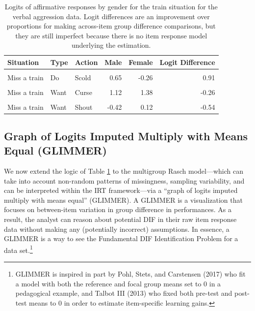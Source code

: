 \documentclass[
  english,
  man,floatsintext]{apa6}
\begin{document}
\begin{table}[H]

\caption{\label{tab:logits}Logits of affirmative responses by gender for the train situation for the verbal aggression data. Logit differences are an improvement over proportions for making across-item group difference comparisons, but they are still imperfect because there is no item response model underlying the estimation. }
\centering
\fontsize{10}{12}\selectfont
\begin{tabular}[t]{lllrrr}
\toprule
Situation & Type & Action & Male & Female & Logit Difference\\
\midrule
\cellcolor{gray!6}{Miss a train} & \cellcolor{gray!6}{Do} & \cellcolor{gray!6}{Curse} & \cellcolor{gray!6}{1.44} & \cellcolor{gray!6}{0.44} & \cellcolor{gray!6}{1.00}\\
Miss a train & Do & Scold & 0.65 & -0.26 & 0.91\\
\cellcolor{gray!6}{Miss a train} & \cellcolor{gray!6}{Do} & \cellcolor{gray!6}{Shout} & \cellcolor{gray!6}{-0.91} & \cellcolor{gray!6}{-1.18} & \cellcolor{gray!6}{0.28}\\
Miss a train & Want & Curse & 1.12 & 1.38 & -0.26\\
\cellcolor{gray!6}{Miss a train} & \cellcolor{gray!6}{Want} & \cellcolor{gray!6}{Scold} & \cellcolor{gray!6}{0.42} & \cellcolor{gray!6}{0.55} & \cellcolor{gray!6}{-0.13}\\
\addlinespace
Miss a train & Want & Shout & -0.42 & 0.12 & -0.54\\
\bottomrule
\end{tabular}
\end{table}

\hypertarget{graph-of-logits-imputed-multiply-with-means-equal-glimmer}{%
\subsection{Graph of Logits Imputed Multiply with Means Equal (GLIMMER)}\label{graph-of-logits-imputed-multiply-with-means-equal-glimmer}}

We now extend the logic of Table \ref{tab:logits} to the multigroup Rasch model---which can take into account non-random patterns of missingness, sampling variability, and can be interpreted within the IRT framework---via a ``graph of logits imputed multiply with means equal'' (GLIMMER). A GLIMMER is a visualization that focuses on between-item variation in group difference in performances. As a result, the analyst can reason about potential DIF in their raw item response data without making any (potentially incorrect) assumptions. In essence, a GLIMMER is a way to see the Fundamental DIF Identification Problem for a data set.\footnote{GLIMMER is inspired in part by Pohl, Stets, and Carstensen (2017) who fit a model with both the reference and focal group means set to 0 in a pedagogical example, and Talbot III (2013) who fixed both pre-test and post-test means to 0 in order to estimate item-specific learning gains.}
\end{document}
